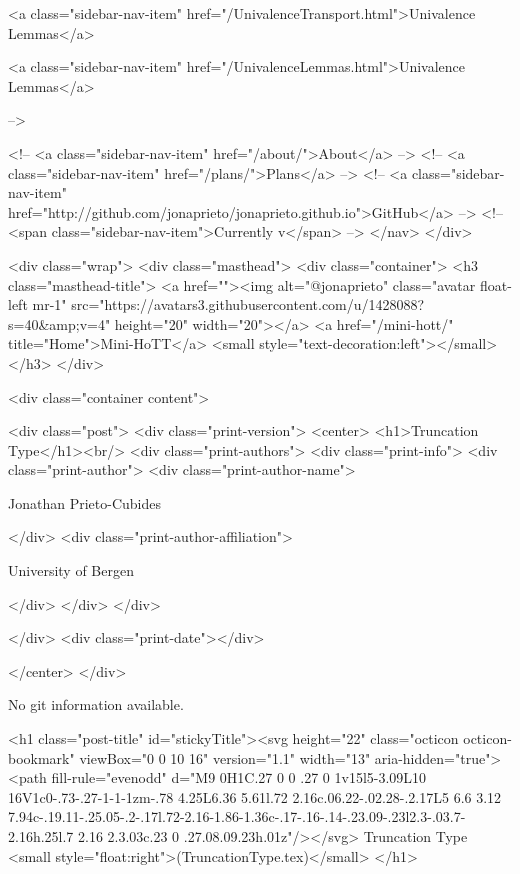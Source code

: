           <a class="sidebar-nav-item" href="/UnivalenceTransport.html">Univalence Lemmas</a>
        
      
    
      
        
          <a class="sidebar-nav-item" href="/UnivalenceLemmas.html">Univalence Lemmas</a>
        
      
     -->

    <!-- <a class="sidebar-nav-item" href="/about/">About</a> -->
    <!-- <a class="sidebar-nav-item" href="/plans/">Plans</a> -->
    <!-- <a class="sidebar-nav-item" href="http://github.com/jonaprieto/jonaprieto.github.io">GitHub</a> -->
    <!-- <span class="sidebar-nav-item">Currently v</span> -->
  </nav>
</div>

    <div class="wrap">
      <div class="masthead">
        <div class="container">
          <h3 class="masthead-title">
            <a href=""><img alt="@jonaprieto" class="avatar float-left mr-1" src="https://avatars3.githubusercontent.com/u/1428088?s=40&amp;v=4" height="20" width="20"></a>
            <a href="/mini-hott/" title="Home">Mini-HoTT</a>
            <small style="text-decoration:left"></small>
          </h3>
        </div>
      
      <div class="container content">
        







<div class="post">
  <div class="print-version">
    <center>
      <h1>Truncation Type</h1><br/>
        <div class="print-authors">
          <div class="print-info">
            <div class="print-author">
              <div class="print-author-name">
                
                  Jonathan Prieto-Cubides
                
              </div>
              <div class="print-author-affiliation">
                
                  University of Bergen
                
                </div>
            </div>
          </div>
          
          
        </div>
        <div class="print-date"></div>
        
        
    </center>
  </div>

  
  No git information available.
  

  <h1 class="post-title" id="stickyTitle"><svg height="22" class="octicon octicon-bookmark" viewBox="0 0 10 16" version="1.1" width="13" aria-hidden="true"><path fill-rule="evenodd" d="M9 0H1C.27 0 0 .27 0 1v15l5-3.09L10 16V1c0-.73-.27-1-1-1zm-.78 4.25L6.36 5.61l.72 2.16c.06.22-.02.28-.2.17L5 6.6 3.12 7.94c-.19.11-.25.05-.2-.17l.72-2.16-1.86-1.36c-.17-.16-.14-.23.09-.23l2.3-.03.7-2.16h.25l.7 2.16 2.3.03c.23 0 .27.08.09.23h.01z"/></svg> Truncation Type <small style="float:right">(TruncationType.tex)</small>
  </h1>

